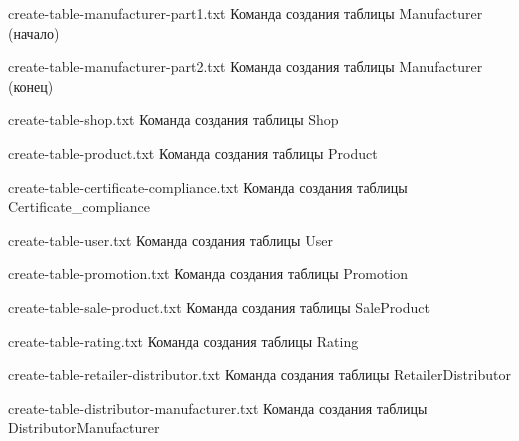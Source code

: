 {create-table-manufacturer-part1.txt} %
{Команда создания таблицы Manufacturer (начало)} %

{create-table-manufacturer-part2.txt} %
{Команда создания таблицы Manufacturer (конец)} %

{create-table-shop.txt} %
{Команда создания таблицы Shop} %

{create-table-product.txt} %
{Команда создания таблицы Product} %

\clearpage 

{create-table-certificate-compliance.txt} %
{Команда создания таблицы Certificate\_compliance} %

{create-table-user.txt} %
{Команда создания таблицы User} %

{create-table-promotion.txt} %
{Команда создания таблицы Promotion} %

\clearpage

{create-table-sale-product.txt} %
{Команда создания таблицы SaleProduct} %

{create-table-rating.txt} %
{Команда создания таблицы Rating} %

{create-table-retailer-distributor.txt} %
{Команда создания таблицы RetailerDistributor} %

{create-table-distributor-manufacturer.txt} %
{Команда создания таблицы DistributorManufacturer} %

